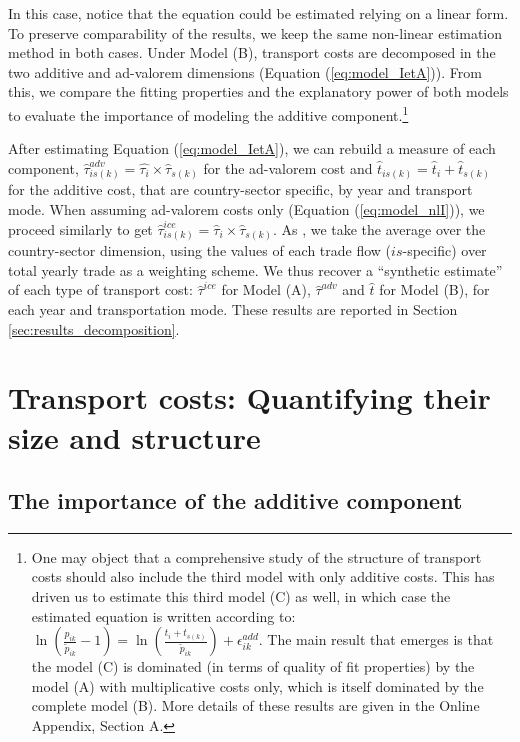 \documentclass[a4paper,11pt]{article}
\begin{document}
In this case, notice that the equation could be estimated relying on a linear form. To preserve comparability of the results, we keep the same non-linear estimation method in both cases. Under Model (B), transport costs are decomposed in the two additive and ad-valorem dimensions (Equation (\ref{eq:model_IetA})).
From this, we compare the fitting properties and the explanatory power of both models to evaluate the importance of modeling the additive component.\footnote{One may object that a comprehensive study of the structure of transport costs should also include the third model with only additive costs. This has driven us to estimate this third model (C) as well, in which case the estimated equation is written according to: $\ln\left(\frac{p_{ik}}{\widetilde{p}_{ik}}-1 \right)= \ln \left(\frac{t_{i} + t_{s(k)}}{\widetilde{p}_{ik}}\right) + \epsilon^{add}_{ik}$.
The main result that emerges is that the model (C) is dominated (in terms of quality of fit properties) by the model (A) with multiplicative costs only, which is itself dominated by the complete model (B). More details of these results are given in the Online Appendix, Section A.}

After estimating Equation (\ref{eq:model_IetA}), we can rebuild a measure of each component, $\widehat{\tau}^{adv}_{is(k)} = \widehat{\tau_{i}} \times \widehat{\tau}_{s(k)}$ for the ad-valorem cost and $\widehat{t}_{is(k)} = \widehat{t}_{i} + \widehat{t}_{s(k)}$ for the additive cost, that are country-sector specific, by year and transport mode.
When assuming ad-valorem costs only (Equation (\ref{eq:model_nlI})), we proceed similarly to get $\widehat{\tau}^{ice}_{is(k)} = \widehat{\tau}_{i} \times \widehat{\tau}_{s(k)}$.
As \cite{Irrazabal_2015}, we take the average over the country-sector dimension, using the values of each trade flow ($is$-specific) over total yearly trade as a weighting scheme.
We thus recover a ``synthetic estimate'' of each type of transport cost: $\widehat{\tau}^{ice}$ for Model (A), $\widehat{\tau}^{adv}$ and $\widehat{t}$ for Model (B), for each year and transportation mode. These results are reported in Section \ref{sec:results_decomposition}.


\section{Transport costs: Quantifying their size and structure}\label{sec:basic_results}

\subsection{The importance of the additive component \label{sec:results_decomposition}}
\end{document}

